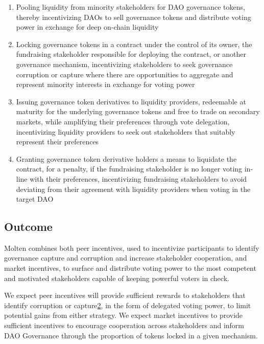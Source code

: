 \documentclass[
]{article}
\begin{document}
\begin{enumerate}
\def\labelenumi{\arabic{enumi}.}
\item
  Pooling liquidity from minority stakeholders for DAO governance
  tokens, thereby incentivizing DAOs to sell governance tokens and
  distribute voting power in exchange for deep on-chain liquidity
\item
  Locking governance tokens in a contract under the control of its
  owner, the fundraising stakeholder responsible for deploying the
  contract, or another governance mechanism, incentivizing stakeholders
  to seek governance corruption or capture where there are opportunities
  to aggregate and represent minority interests in exchange for voting
  power
\item
  Issuing governance token derivatives to liquidity providers,
  redeemable at maturity for the underlying governance tokens and free
  to trade on secondary markets, while amplifying their preferences
  through vote delegation, incentivizing liquidity providers to seek out
  stakeholders that suitably represent their preferences
\item
  Granting governance token derivative holders a means to liquidate the
  contract, for a penalty, if the fundraising stakeholder is no longer
  voting in-line with their preferences, incentivizing fundraising
  stakeholders to avoid deviating from their agreement with liquidity
  providers when voting in the target DAO
\end{enumerate}

\hypertarget{outcome}{%
\subsection{Outcome}\label{outcome}}

Molten combines both peer incentives, used to incentivize participants
to identify governance capture and corruption and increase stakeholder
cooperation, and market incentives, to surface and distribute voting
power to the most competent and motivated stakeholders capable of
keeping powerful voters in check.

We expect peer incentives will provide sufficient rewards to
stakeholders that identify corruption or
capture\href{https://doi.org/10.1371/journal.pcbi.1004232}{2}, in the
form of delegated voting power, to limit potential gains from either
strategy. We expect market incentives to provide sufficient incentives
to encourage cooperation across stakeholders and inform DAO Governance
through the proportion of tokens locked in a given mechanism.
\end{document}

